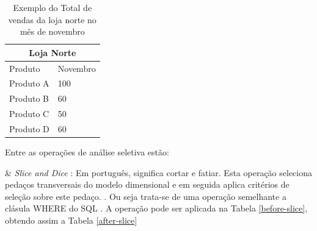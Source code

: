 \begin{table}[!ht]
\centering
\begin{tabular}{|l|l|}
\hline
\multicolumn{2}{|c|}{Loja Norte} \\ \hline
\cline{1-2}
Produto         & Novembro       \\ \hline
Produto A & 100 \\ \hline
Produto B & 60  \\ \hline
Produto C & 50  \\ \hline
Produto D & 60  \\ \hline

\end{tabular}
\caption{Exemplo do Total de vendas da loja norte no mês de novembro}
\label{after-across}
\end{table}

Entre as operações de análise seletiva estão:

\begin{easylist}[itemize]

& \textit{Slice and Dice} : Em português, significa cortar e fatiar. Esta operação seleciona pedaços transversais do modelo dimensional e em seguida aplica critérios de seleção sobre este pedaço. \cite{andre2000}. Ou seja trata-se de uma operação semelhante a clásula WHERE do SQL \cite{valeria2012}. A operação pode ser aplicada na Tabela \ref{before-slice}, obtendo assim a Tabela \ref{after-slice}


\end{easylist}

